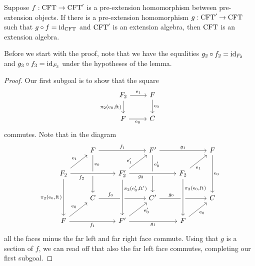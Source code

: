 \begin{lem}\label{esys-retract}
Suppose $f:\mathrm{CFT}\to\mathrm{CFT}'$ is a pre-extension homomorphism between
pre-extension objects. If there is a pre-extension homomorphism $g:\mathrm{CFT}'\to
\mathrm{CFT}$ such that $g\circ f={\mathrm{id}_{\mathrm{CFT}}}$ and $\mathrm{CFT}'$ is an extension
algebra, then $\mathrm{CFT}$ is an extension algebra.
\end{lem}

Before we start with the proof, note that we have the equalities
$g_2\circ f_2={\mathrm{id}_{F_2}}$ and $g_3\circ f_3={\mathrm{id}_{F_3}}$
under the hypotheses of the lemma.

\begin{proof}
Our first subgoal is to show that the square
\begin{equation*}
\begin{tikzcd}
\stesysf_2 
  \ar{r}{\efamext} 
  \ar{d}[swap]{\pullbackpr{2}{\ectxext}{\eft}} 
  & 
\stesysf 
  \ar{d}{\ectxext}
  \\
\stesysf
  \ar{r}[swap]{\ectxext} 
  & 
\stesysc
\end{tikzcd}
\end{equation*}
commutes. Note that in the diagram
\begin{equation*}
\begin{tikzcd}
  {}
  & 
\stesysf
  \ar{dd}[near start]{\ectxext}
  \ar{rr}{f_1}
  &
  &
\stesysf'
  \ar{dd}[near start]{\ectxext'}
  \ar{rr}{g_1}
  &
  &
\stesysf
  \ar{dd}{\ectxext}
  \\
\stesysf_2
  \ar{dd}[swap]{\pullbackpr{2}{\ectxext}{\eft}}
  \ar[crossing over]{rr}[swap,near start]{f_2}
  \ar{ur}{\efamext}
  &
  &
\stesysf_2'
  \ar{ur}[near start]{\efamext'}
  \ar[crossing over]{rr}[swap,near start]{g_2}
  &
  &
\stesysf_2
  \ar{ur}[swap,near start]{\efamext}
  \\
  {}
  &
\stesysc
  \ar{rr}[near start]{f_0}
  &
  &
\stesysc'
  \ar{rr}[near start]{g_0}
  &
  &
\stesysc
  \\
\stesysf 
  \ar{rr}[swap]{f_1}
  \ar{ur}{\ectxext}
  &
  &
\stesysf' 
  \ar[crossing over,leftarrow]{uu}[near end,swap]{\pullbackpr{2}{\ectxext'}{\eft'}}
  \ar{ur}[swap,near end]{\ectxext'}
  \ar{rr}[swap]{g_1}
  &
  &
\stesysf
  \ar[crossing over,leftarrow]{uu}[near end,swap]{\pullbackpr{2}{\ectxext}{\eft}}
  \ar{ur}[swap]{\ectxext}
\end{tikzcd}
\end{equation*}
all the faces minus the far left and far right face commute. Using that $g$
is a section of $f$, we can read off that also the far left face commutes,
completing our first subgoal.
 

\end{proof}
